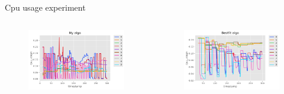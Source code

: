 \documentclass[10pt,xcolor={dvipsnames}, aspectratio=169]{beamer}
\begin{document}
\begin{frame}
{Cpu usage experiment} 
	\begin{columns}
		\begin{column}{0.48\textwidth}
			\begin{figure}
				\centering
				\includegraphics[scale=0.45]{images/myalgo_cpu.png}
			\end{figure}
		\end{column}

		\hfill		
		
		\begin{column}{0.48\textwidth}
			\begin{figure}
				\centering
				\includegraphics[scale=0.45]{images/bestfit_cpu.png}
			\end{figure}		
		\end{column}
	\end{columns}
\end{frame}
\end{document}
